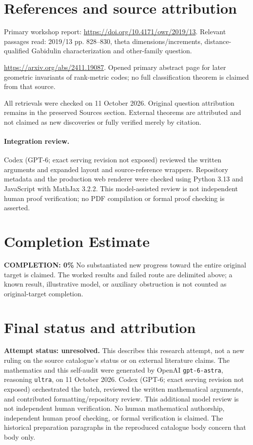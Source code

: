 \documentclass[11pt]{article}
\begin{document}
\section{References and source attribution}
Primary workshop report: \url{https://doi.org/10.4171/owr/2019/13}. Relevant passages read: 2019/13 pp. 828--830, theta dimensions/increments, distance-qualified Gabidulin characterization and other-family question.

\url{https://arxiv.org/abs/2411.19087}. Opened primary abstract page for later geometric invariants of rank-metric codes; no full classification theorem is claimed from that source.

All retrievals were checked on 11 October 2026. Original question attribution remains in the preserved Sources section. External theorems are attributed and not claimed as new discoveries or fully verified merely by citation.


\paragraph{Integration review.} Codex (GPT-6; exact serving revision not exposed) reviewed the written arguments and expanded layout and source-reference wrappers. Repository metadata and the production web renderer were checked using Python 3.13 and JavaScript with MathJax 3.2.2. This model-assisted review is not independent human proof verification; no PDF compilation or formal proof checking is asserted.

\section{Completion Estimate}
\noindent\textbf{COMPLETION: 0\%}
No substantiated new progress toward the entire original target is claimed. The worked results and failed route are delimited above; a known result, illustrative model, or auxiliary obstruction is not counted as original-target completion.

\section{Final status and attribution}
\textbf{Attempt status: unresolved.} This describes this research attempt, not a new ruling on the source catalogue's status or on external literature claims.
The mathematics and this self-audit were generated by OpenAI \texttt{gpt-6-astra}, reasoning \texttt{ultra}, on 11 October 2026. Codex (GPT-6; exact serving revision not exposed) orchestrated the batch, reviewed the written mathematical arguments, and contributed formatting/repository review. This additional model review is not independent human verification. No human mathematical authorship, independent human proof checking, or formal verification is claimed. The historical preparation paragraphs in the reproduced catalogue body concern that body only.
\end{document}

